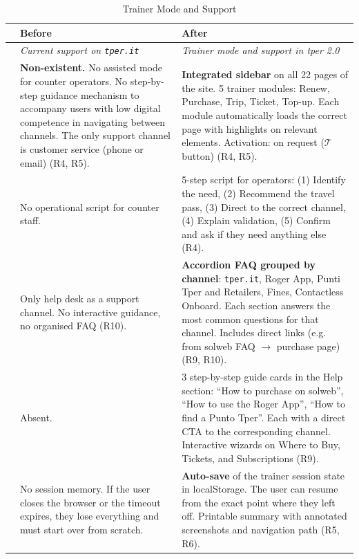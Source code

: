 \begin{table}[H]
\centering
\small
\renewcommand{\arraystretch}{1.4}
\begin{tabular}{|p{0.5cm}|p{7cm}|p{7cm}|}
\hline
& \textbf{Before} & \textbf{After} \\ \hline
\cellcolor{primaryColor!15} &
\textit{Current support on \texttt{tper.it}} &
\textit{Trainer mode and support in tper 2.0} \\ \hline

\raisebox{0.5cm}{\rotatebox{90}{\textbf{Trainer}}} &
\textbf{Non-existent.} No assisted mode for counter operators. No step-by-step guidance mechanism to accompany users with low digital competence in navigating between channels. The only support channel is customer service (phone or email) (R4, R5). &
\textbf{Integrated sidebar} on all 22 pages of the site. 5 trainer modules: Renew, Purchase, Trip, Ticket, Top-up. Each module automatically loads the correct page with highlights on relevant elements. Activation: on request ($\mathcal{T}$ button) (R4, R5). \\ \hline

\raisebox{0.5cm}{\rotatebox{90}{\textbf{Script}}} &
No operational script for counter staff. &
5-step script for operators: (1) Identify the need, (2) Recommend the travel pass, (3) Direct to the correct channel, (4) Explain validation, (5) Confirm and ask if they need anything else (R4). \\ \hline

\raisebox{0.5cm}{\rotatebox{90}{\textbf{FAQ}}} &
Only help desk as a support channel. No interactive guidance, no organised FAQ (R10). &
\textbf{Accordion FAQ grouped by channel}: \texttt{tper.it}, Roger App, Punti Tper and Retailers, Fines, Contactless Onboard. Each section answers the most common questions for that channel. Includes direct links (e.g. from solweb FAQ $\rightarrow$ purchase page) (R9, R10). \\ \hline

\raisebox{0.5cm}{\rotatebox{90}{\textbf{Guides}}} &
Absent. &
3 step-by-step guide cards in the Help section: ``How to purchase on solweb'', ``How to use the Roger App'', ``How to find a Punto Tper''. Each with a direct CTA to the corresponding channel. Interactive wizards on Where to Buy, Tickets, and Subscriptions (R9). \\ \hline

\raisebox{0.5cm}{\rotatebox{90}{\textbf{Persistence}}} &
No session memory. If the user closes the browser or the timeout expires, they lose everything and must start over from scratch. &
\textbf{Auto-save} of the trainer session state in localStorage. The user can resume from the exact point where they left off. Printable summary with annotated screenshots and navigation path (R5, R6). \\ \hline
\end{tabular}
\caption{Trainer Mode and Support}
\label{tab:comparison-trainer}
\end{table}

